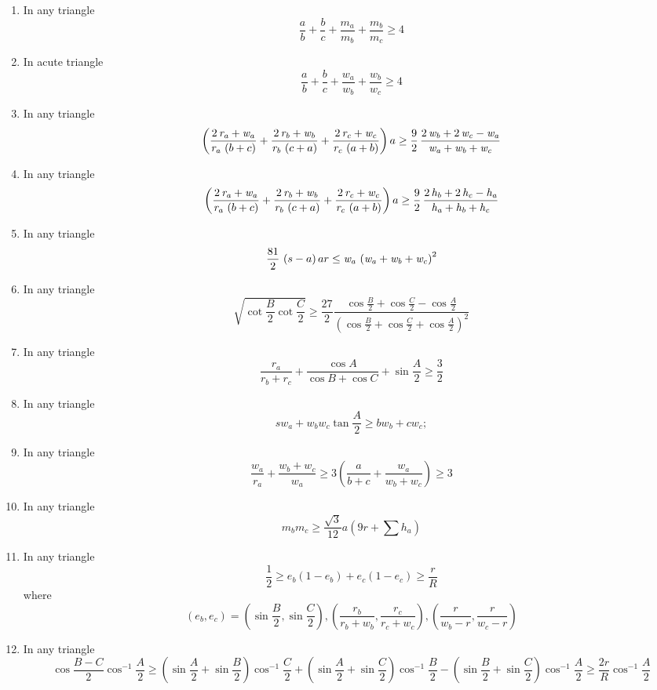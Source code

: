 \documentclass{report}
\begin{document}
\begin{enumerate}
	\item In any triangle$$\frac {a}{b} + \frac {b}{c} + \frac {m_a}{m_b} + \frac {m_b}{m_c} \geq 4$$	
	\item In acute triangle $$\frac {a}{b} + \frac {b}{c} + \frac {w_a}{w_b} + \frac {w_b}{w_c} \geq 4$$
	\item In any triangle $$\left( {\frac {2\,{\it r_a} + {\it w_a}}{{\it r_a}\, \left( b + c \right) }} + {\frac {2\,{\it r_b} + {\it w_b}}{{\it r_b}\, \left( c + a \right) }} + {\frac {2\,{\it r_c} + {\it w_c}}{{\it r_c}\, \left( a + b \right) }} \right) a \geq \frac {9}{2}\,{\frac {2\,{\it w_b} + 2\,{\it w_c} - {\it w_a}}{{\it w_a} + {\it w_b} + {\it w_c}}}$$	
	\item In any triangle$$\left( {\frac {2\,{\it r_a} + {\it w_a}}{{\it r_a}\, \left( b + c \right) }} + {\frac {2\,{\it r_b} + {\it w_b}}{{\it r_b}\, \left( c + a \right) }} + {\frac {2\,{\it r_c} + {\it w_c}}{{\it r_c}\, \left( a + b \right) }} \right) a \geq \frac {9}{2}\,{\frac {2\,{\it h_b} + 2\,{\it h_c} - {\it h_a}}{{\it h_a} + {\it h_b} + {\it h_c}}}$$
	\item In any triangle $${\frac {81}{2}}\, \left( s - a \right) ar\leq {\it w_a}\, \left( {\it w_a} + {\it w_b} + {\it w_c} \right) ^{2}$$
	\item In any triangle$$\sqrt {\cot\frac {B}{2}\cot\frac {C}{2}} \geq \frac {27}{2}\frac {\cos\frac {B}{2} + \cos\frac {C}{2} - \cos\frac {A}{2}}{(\cos\frac {B}{2} + \cos\frac {C}{2} + \cos\frac {A}{2})^2}$$
	\item In any triangle$$\frac {r_a}{r_b + r_c} + \frac {\cos{A}}{\cos{B} + \cos{C}} + \sin\frac {A}{2}\geq \frac {3}{2}$$
	\item In any triangle$$sw_a+w_bw_c\tan\frac{A}{2} \geq bw_b+cw_c;$$
	\item In any triangle$$\frac {w_a}{r_a} + \frac {w_b + w_c}{w_a}\geq 3(\frac {a}{b + c} + \frac {w_a}{w_b + w_c})\geq 3$$
	\item In any triangle$$m_bm_c\geq \frac {\sqrt {3}}{12}a(9r + \sum{h_a})$$
	\item In any triangle$$\frac {1}{2} \geq e_b(1 - e_b) + e_c(1 - e_c) \geq \frac {r}{R}$$where$$(e_b,e_c) = \left( \sin\frac {B}{2},\sin\frac {C}{2}\right) ,\left( \frac {r_b}{r_b + w_b},\frac {r_c}{r_c + w_c}\right) ,\left( \frac {r}{w_b - r},\frac {r}{w_c - r}\right) $$
	\item In any triangle$$\cos\frac {B - C}{2}\cos^{ - 1}\frac {A}{2}\geq (\sin\frac {A}{2} + \sin\frac {B}{2})\cos^{ - 1}\frac {C}{2} + (\sin\frac {A}{2} + \sin\frac {C}{2})\cos^{ - 1}\frac {B}{2} - (\sin\frac {B}{2} + \sin\frac {C}{2})\cos^{ - 1}\frac {A}{2}\geq \frac {2r}{R}\cos^{ - 1}\frac {A}{2}$$

\end{enumerate}
\end{document}
